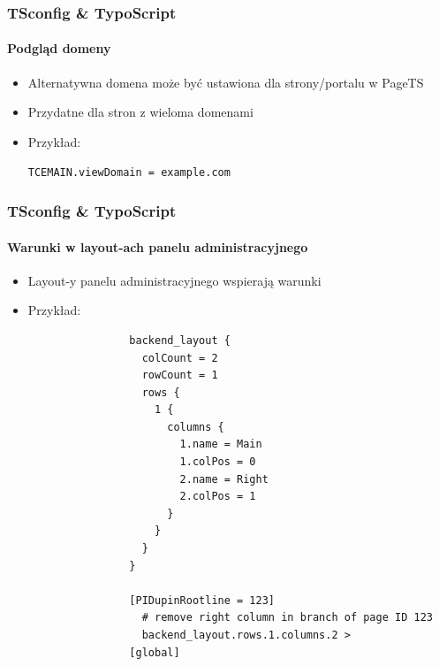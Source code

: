 
\begin{frame}[fragile]
	\frametitle{TSconfig \& TypoScript}
	\framesubtitle{Podgląd domeny}

	\begin{itemize}

		\item Alternatywna domena może być ustawiona dla strony/portalu w PageTS
		\item Przydatne dla stron z wieloma domenami
		\item Przykład:

			\lstinline!TCEMAIN.viewDomain = example.com!

	\end{itemize}

\end{frame}


\begin{frame}[fragile]
	\frametitle{TSconfig \& TypoScript}
	\framesubtitle{Warunki w layout-ach panelu administracyjnego}

	\begin{itemize}

		\item Layout-y panelu administracyjnego wspierają warunki
		\item Przykład:

			\lstset{
				basicstyle=\tiny\ttfamily
			}

			\begin{lstlisting}
				backend_layout {
				  colCount = 2
				  rowCount = 1
				  rows {
				    1 {
				      columns {
				        1.name = Main
				        1.colPos = 0
				        2.name = Right
				        2.colPos = 1
				      }
				    }
				  }
				}

				[PIDupinRootline = 123]
				  # remove right column in branch of page ID 123
				  backend_layout.rows.1.columns.2 >
				[global]
			\end{lstlisting}

	\end{itemize}

\end{frame}


